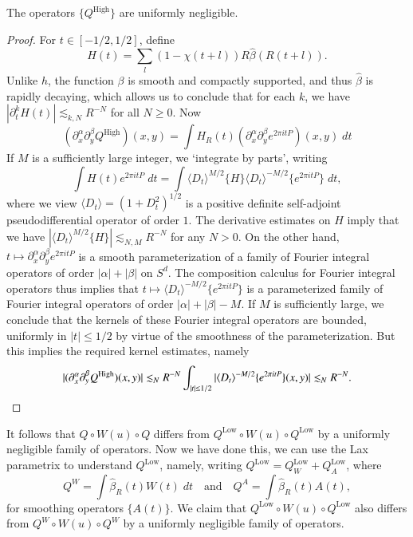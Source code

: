 \begin{lemma} \label{LargeTimeQBounds}
    The operators $\{ Q^{\text{High}} \}$ are uniformly negligible.
\end{lemma}
\begin{proof}
    For $t \in [-1/2,1/2]$, define
    \[ H(t) = \sum_l (1 - \chi(t + l)) R \widehat{\beta}(R (t + l)). \]
    Unlike $h$, the function $\beta$ is smooth and compactly supported, and thus $\widehat{\beta}$ is rapidly decaying, which allows us to conclude that for each $k$, we have $|\partial_t^k H(t)| \lesssim_{k,N} R^{-N}$ for all $N \geq 0$. Now
    \[ (\partial_x^\alpha \partial_y^\beta Q^{\text{High}})(x,y) = \int H_R(t) (\partial_x^\alpha \partial_y^\beta e^{2 \pi i t P})(x,y)\; dt \]
    If $M$ is a sufficiently large integer, we `integrate by parts', writing
    \[ \int H(t) e^{2 \pi i t P}\; dt = \int \langle D_t \rangle^{M/2} \{ H \} \langle D_t \rangle^{-M/2} \{ e^{2 \pi i t P} \}\; dt, \]
    where we view $\langle D_t \rangle = (1 + D_t^2)^{1/2}$ is a positive definite self-adjoint pseudodifferential operator of order $1$. The derivative estimates on $H$ imply that we have $|\langle D_t \rangle^{M/2} \{ H \}| \lesssim_{N,M} R^{-N}$ for any $N > 0$. On the other hand, $t \mapsto \partial_x^\alpha \partial_y^\beta e^{2 \pi i t P}$ is a smooth parameterization of a family of Fourier integral operators of order $|\alpha| + |\beta|$ on $S^d$. The composition calculus for Fourier integral operators thus implies that $t \mapsto \langle D_t \rangle^{-M/2} \{ e^{2 \pi i t P} \}$ is a parameterized family of Fourier integral operators of order $|\alpha| + |\beta| - M$. If $M$ is sufficiently large, we conclude that the kernels of these Fourier integral operators are bounded, uniformly in $|t| \leq 1/2$ by virtue of the smoothness of the parameterization. But this implies the required kernel estimates, namely
    \[ |(\partial_x^\alpha \partial_y^\beta Q^{\text{High}})(x,y)| \lesssim_N R^{-N} \int_{|t| \leq 1/2} |\langle D_t \rangle^{-M/2} \{ e^{2 \pi i t P} \}(x,y)| \lesssim_N R^{-N}. \qedhere \]
\end{proof}

It follows that $Q \circ W(u) \circ Q$ differs from $Q^{\text{Low}} \circ W(u) \circ Q^{\text{Low}}$ by a uniformly negligible family of operators. Now we have done this, we can use the Lax parametrix to understand $Q^{\text{Low}}$, namely, writing $Q^{\text{Low}} = Q^{\text{Low}}_W + Q^{\text{Low}}_A$, where
%
\[ Q^W = \int \widehat{\beta}_R(t) W(t)\; dt \quad\text{and}\quad Q^A = \int \widehat{\beta}_R(t) A(t), \]
%
for smoothing operators $\{ A(t) \}$. We claim that $Q^{\text{Low}} \circ W(u) \circ Q^{\text{Low}}$ also differs from $Q^W \circ W(u) \circ Q^W$ by a uniformly negligible family of operators.

